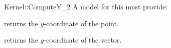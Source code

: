 \begin{ccRefFunctionObjectConcept}{Kernel::ComputeY_2}
A model for this must provide:


       {returns the $y$-coordinate of the point.}

       {returns the $y$-coordinate of the vector.}

\ccRefines
{}



\end{ccRefFunctionObjectConcept}
